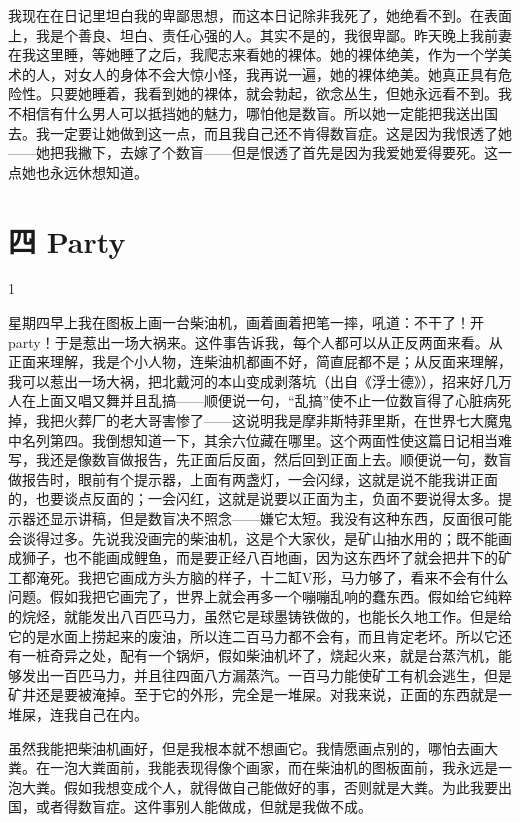 我现在在日记里坦白我的卑鄙思想，而这本日记除非我死了，她绝看不到。在表面上，我是个善良、坦白、责任心强的人。其实不是的，我很卑鄙。昨天晚上我前妻在我这里睡，等她睡了之后，我爬志来看她的裸体。她的裸体绝美，作为一个学美术的人，对女人的身体不会大惊小怪，我再说一遍，她的裸体绝美。她真正具有危险性。只要她睡着，我看到她的裸体，就会勃起，欲念丛生，但她永远看不到。我不相信有什么男人可以抵挡她的魅力，哪怕他是数盲。所以她一定能把我送出国去。我一定要让她做到这一点，而且我自己还不肯得数盲症。这是因为我恨透了她——她把我撇下，去嫁了个数盲——但是恨透了首先是因为我爱她爱得要死。这一点她也永远休想知道。

\section{四 Party}

1 

星期四早上我在图板上画一台柴油机，画着画着把笔一摔，吼道：不干了！开party！于是惹出一场大祸来。这件事告诉我，每个人都可以从正反两面来看。从正面来理解，我是个小人物，连柴油机都画不好，简直屁都不是；从反面来理解，我可以惹出一场大祸，把北戴河的本山变成剥落坑（出自《浮士德》），招来好几万人在上面又唱又舞并且乱搞——顺便说一句，“乱搞”使不止一位数盲得了心脏病死掉，我把火葬厂的老大哥害惨了——这说明我是摩非斯特菲里斯，在世界七大魔鬼中名列第四。我倒想知道一下，其余六位藏在哪里。这个两面性使这篇日记相当难写，我还是像数盲做报告，先正面后反面，然后回到正面上去。顺便说一句，数盲做报告时，眼前有个提示器，上面有两盏灯，一会闪绿，这就是说不能我讲正面的，也要谈点反面的；一会闪红，这就是说要以正面为主，负面不要说得太多。提示器还显示讲稿，但是数盲决不照念——嫌它太短。我没有这种东西，反面很可能会谈得过多。先说我没画完的柴油机，这是个大家伙，是矿山抽水用的；既不能画成狮子，也不能画成鲤鱼，而是要正经八百地画，因为这东西坏了就会把井下的矿工都淹死。我把它画成方头方脑的样子，十二缸V形，马力够了，看来不会有什么问题。假如我把它画完了，世界上就会再多一个嘣嘣乱响的蠢东西。假如给它纯粹的烷烃，就能发出八百匹马力，虽然它是球墨铸铁做的，也能长久地工作。但是给它的是水面上捞起来的废油，所以连二百马力都不会有，而且肯定老坏。所以它还有一桩奇异之处，配有一个锅炉，假如柴油机坏了，烧起火来，就是台蒸汽机，能够发出一百匹马力，并且往四面八方漏蒸汽。一百马力能使矿工有机会逃生，但是矿井还是要被淹掉。至于它的外形，完全是一堆屎。对我来说，正面的东西就是一堆屎，连我自己在内。 

虽然我能把柴油机画好，但是我根本就不想画它。我情愿画点别的，哪怕去画大粪。在一泡大粪面前，我能表现得像个画家，而在柴油机的图板面前，我永远是一泡大粪。假如我想变成个人，就得做自己能做好的事，否则就是大粪。为此我要出国，或者得数盲症。这件事别人能做成，但就是我做不成。 



